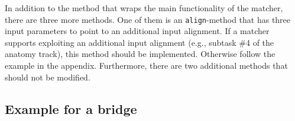 \documentclass{article}
\def\file#1{\textcolor{grayy}{\texttt{#1}}}
\def\tool#1{\textsl{#1}}
\begin{document}
In addition to the method that wraps the main functionality of the matcher, there are three more methods. One of them is an \verb|align|-method that has three input parameters to point to an additional input alignment. If a matcher supports exploiting an additional input alignment (e.g., subtask \#4 of the anatomy track), this method should be implemented. Otherwise follow the example in the appendix. Furthermore, there are two additional methods that should not be modified.

\subsection{Example for a bridge}
\label{sec:bridge}
\end{document}
